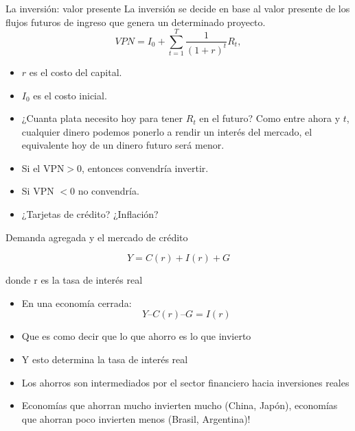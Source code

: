 \documentclass{beamer}
\begin{document}
\begin{frame}{La inversión: valor presente}
    La inversión se decide en base al valor presente de los flujos futuros de ingreso que genera un determinado proyecto.
    \begin{equation}
        VPN = I_0 + \sum_{t=1} ^{T} \frac{1}{(1+r)^t} R_t,
    \end{equation}
    \begin{itemize}
        \item $r$ es el costo del capital.
        \item $I_0$ es el costo inicial.
        \item ¿Cuanta plata necesito hoy para tener $R_t$ en el futuro? Como entre ahora y $t$, cualquier dinero podemos ponerlo a rendir un interés del mercado, el equivalente hoy de un dinero futuro será menor.
        \item Si el VPN$>0$, entonces convendría invertir.
        \item Si VPN $<0$ no convendría.
        \item ¿Tarjetas de crédito? ¿Inflación?
    \end{itemize}
\end{frame}

\begin{frame}{Demanda agregada y el mercado de crédito}

$$ Y = C(r) + I(r) + G $$

\centering \small{donde r es la tasa de interés real}

\begin{itemize}
\item En una economía cerrada:
$$ Y – C(r) – G = I(r) $$
\end{itemize}
\begin{itemize}
\item Que es como decir que lo que ahorro es lo que invierto
\item Y esto determina la tasa de interés real
\item Los ahorros son intermediados por el sector financiero hacia inversiones reales
\item Economías que ahorran mucho invierten mucho (China, Japón), economías que ahorran poco invierten menos (Brasil, Argentina)! 
\end{itemize}
\end{frame}
\end{document}

